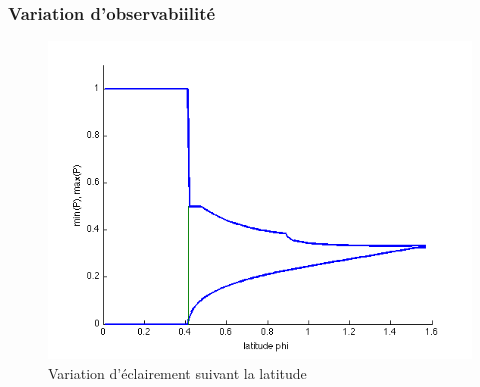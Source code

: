 \documentclass{beamer}
\begin{document}
\begin{frame}
\frametitle{Variation d'observabiilité}


 \begin{figure}[h]
    \centering
    \includegraphics[width=.6\textwidth]{ecart.png}
    \caption{Variation d'éclairement suivant la latitude}
 \end{figure}

  
\end{frame}

\end{document}
